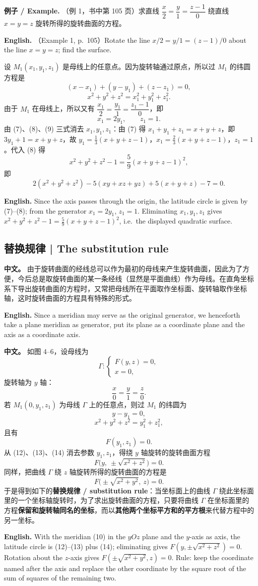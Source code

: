 \documentclass[UTF8,11pt,a4paper]{ctexart}
\newcommand{\APS}[2]{\par\noindent\textbf{中文。} #1\par\noindent\textbf{English.} #2\par\smallskip}
\newcommand{\EN}[1]{\par\noindent \textbf{English.} #1\par}
\newcommand{\EX}[2]{\par\noindent \textbf{例子 / Example.} #1\par\EN{#2}}
\theoremstyle{definition}
\begin{document}
\EX{（例 1，书中第 105 页）求直线 $\dfrac{x}{2}=\dfrac{y}{1}=\dfrac{z-1}{0}$ 绕直线 $x=y=z$ 旋转所得的旋转曲面的方程。}{（Example 1, p.~105）Rotate the line $x/2=y/1=(z-1)/0$ about the line $x=y=z$; find the surface.}
设 $M_1(x_1,y_1,z_1)$ 是母线上的任意点。因为旋转轴通过原点，所以过 $M_1$ 的纬圆方程是
\[
(x-x_1)+(y-y_1)+(z-z_1)=0,\tag{7}
\]
\[
x^2+y^2+z^2=x_1^2+y_1^2+z_1^2.\tag{8}
\]
由于 $M_1$ 在母线上，所以又有 $\dfrac{x_1}{2}=\dfrac{y_1}{1}=\dfrac{z_1-1}{0}$，即
\[
x_1=2y_1,\qquad z_1=1.\tag{9}
\]
由 (7)、(8)、(9) 三式消去 $x_1,y_1,z_1$：由 (7) 得 $x_1+y_1+z_1=x+y+z$，即 $3y_1+1=x+y+z$，故 $y_1=\frac13(x+y+z-1)$，$x_1=\frac23(x+y+z-1)$，$z_1=1$。代入 (8) 得
\[
x^2+y^2+z^2-1=\frac59(x+y+z-1)^2,
\]
即
\[
2(x^2+y^2+z^2)-5(xy+xz+yz)+5(x+y+z)-7=0.
\]
\EN{Since the axis passes through the origin, the latitude circle is given by (7)--(8); from the generator $x_1=2y_1$, $z_1=1$. Eliminating $x_1,y_1,z_1$ gives $x^2+y^2+z^2-1=\frac59(x+y+z-1)^2$, i.e.\ the displayed quadratic surface.}

\subsection{替换规律 | The substitution rule}
\APS{由于旋转曲面的经线总可以作为最初的母线来产生旋转曲面，因此为了方便，今后总是取旋转曲面的某一条经线（显然是平面曲线）作为母线。在直角坐标系下导出旋转曲面的方程时，又常把母线所在平面取作坐标面、旋转轴取作坐标轴，这时旋转曲面的方程具有特殊的形式。}{Since a meridian may serve as the original generator, we henceforth take a plane meridian as generator, put its plane as a coordinate plane and the axis as a coordinate axis.}

\APS{如图 4--6，设母线为
\[
\Gamma:\begin{cases}F(y,z)=0,\\ x=0,\end{cases}\tag{10}
\]
旋转轴为 $y$ 轴：
\[
\frac{x}{0}=\frac{y}{1}=\frac{z}{0}.\tag{11}
\]
若 $M_1(0,y_1,z_1)$ 为母线 $\Gamma$ 上的任意点，则过 $M_1$ 的纬圆为
\[
y-y_1=0,\tag{12}
\]
\[
x^2+y^2+z^2=y_1^2+z_1^2,\tag{13}
\]
且有
\[
F(y_1,z_1)=0.\tag{14}
\]
从 (12)、(13)、(14) 消去参数 $y_1,z_1$，得绕 $y$ 轴旋转的旋转曲面方程
\[
F\bigl(y,\ \pm\sqrt{x^2+z^2}\bigr)=0.\tag{15}
\]
同样，把曲线 $\Gamma$ 绕 $z$ 轴旋转所得的旋转曲面的方程是
\[
F\bigl(\pm\sqrt{x^2+y^2},\ z\bigr)=0.\tag{16}
\]
于是得到如下的\textbf{替换规律 / substitution rule}：当坐标面上的曲线 $\Gamma$ 绕此坐标面里的一个坐标轴旋转时，为了求出旋转曲面的方程，只要将曲线 $\Gamma$ 在坐标面里的方程\textbf{保留和旋转轴同名的坐标}，而以\textbf{其他两个坐标平方和的平方根}来代替方程中的另一坐标。}{With the meridian (10) in the $yOz$ plane and the $y$-axis as axis, the latitude circle is (12)--(13) plus (14); eliminating gives $F(y,\pm\sqrt{x^2+z^2})=0$. Rotation about the $z$-axis gives $F(\pm\sqrt{x^2+y^2},z)=0$. Rule: keep the coordinate named after the axis and replace the other coordinate by the square root of the sum of squares of the remaining two.}
\end{document}
